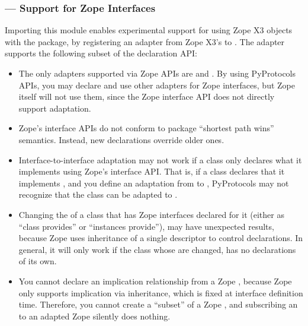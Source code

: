 \begin{verbatim%
}
\begin{verbatim%
}
\begin{verbatim%
}
\begin{verbatim%
}
\begin{verbatim%
}
\begin{verbatim%
}
\newpage
\subsubsection{ --- Support for Zope Interfaces}

Importing this module enables experimental support for using Zope X3
 objects with the  package, by registering
an adapter from Zope X3's  to .  The
adapter supports the following subset of the declaration API:

\begin{itemize}

\item The only adapters supported via Zope APIs are 
and .  By using PyProtocols APIs, you may declare and
use other adapters for Zope interfaces, but Zope itself will not use them, since
the Zope interface API does not directly support adaptation.

\item Zope's interface APIs do not conform to  package
``shortest path wins'' semantics.  Instead, new declarations override older
ones.

\item Interface-to-interface adaptation may not work if a class only declares
what it implements using Zope's interface API.  That is, if a class declares
that it implements , and you define an adaptation from
 to , PyProtocols may not
recognize that the class can be adapted to .

\item Changing the  of a class that has Zope interfaces
declared for it (either as ``class provides'' or ``instances provide''), may
have unexpected results, because Zope uses inheritance of a single descriptor
to control declarations.  In general, it will only work if the class whose
 are changed, has no declarations of its own.

\item You cannot declare an implication relationship from a Zope
, because Zope only supports implication via
inheritance, which is fixed at interface definition time.  Therefore, you cannot
create a ``subset'' of a Zope , and subscribing an
 to an adapted Zope 
silently does nothing.


\end{itemize}
\end{verbatim%
}
\end{verbatim%
}
\end{verbatim%
}
\end{verbatim%
}
\end{verbatim%
}
\end{verbatim%
}
